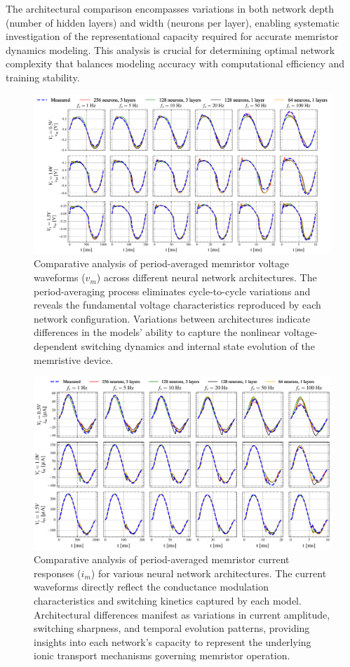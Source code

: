 \documentclass[11pt, oneside]{article}
\begin{document}
The architectural comparison encompasses variations in both network depth (number of hidden layers) and width (neurons per layer), enabling systematic investigation of the representational capacity required for accurate memristor dynamics modeling. This analysis is crucial for determining optimal network complexity that balances modeling accuracy with computational efficiency and training stability.

\begin{figure}[htbp!]
    \centering
    \includegraphics[width=\linewidth]{sample_results/simulated_vms.pdf}
    \caption{Comparative analysis of period-averaged memristor voltage waveforms ($v_m$) across different neural network architectures. The period-averaging process eliminates cycle-to-cycle variations and reveals the fundamental voltage characteristics reproduced by each network configuration. Variations between architectures indicate differences in the models' ability to capture the nonlinear voltage-dependent switching dynamics and internal state evolution of the memristive device.}
\end{figure}

\begin{figure}[htbp!]
    \centering
    \includegraphics[width=\linewidth]{sample_results/simulated_ims.pdf}
    \caption{Comparative analysis of period-averaged memristor current responses ($i_m$) for various neural network architectures. The current waveforms directly reflect the conductance modulation characteristics and switching kinetics captured by each model. Architectural differences manifest as variations in current amplitude, switching sharpness, and temporal evolution patterns, providing insights into each network's capacity to represent the underlying ionic transport mechanisms governing memristor operation.}
\end{figure}
\end{document}
